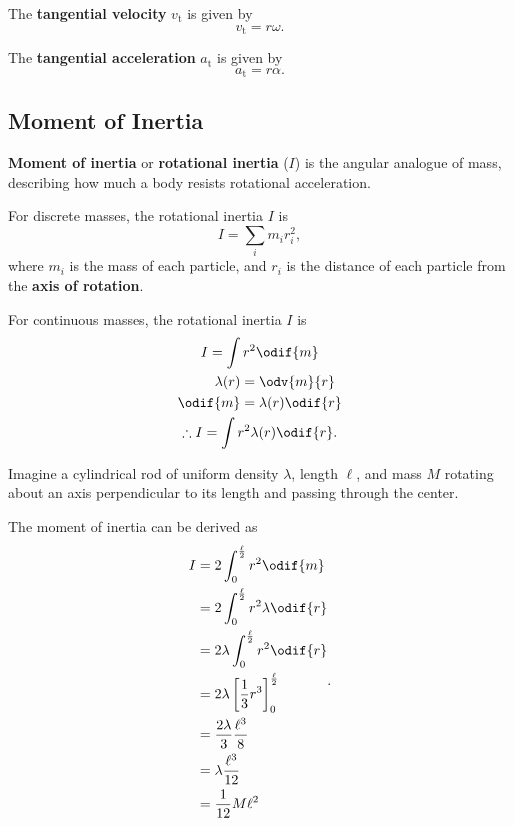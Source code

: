 The \textbf{tangential velocity} \(v_\mathrm{t}\) is given by
\begin{equation}
    v_\mathrm{t} = r \omega.
\end{equation}

The \textbf{tangential acceleration} \(a_\mathrm{t}\) is given by
\begin{equation}
    a_\mathrm{t} = r \alpha.
\end{equation}

\subsection{Moment of Inertia}

\textbf{Moment of inertia} or \textbf{rotational inertia} (\(I\)) is
the angular analogue of mass,
describing how much a body resists rotational acceleration.

For discrete masses, the rotational inertia \(I\) is
\begin{equation}
    I = \sum_i m_i r_i^2,
\end{equation}
where \(m_i\) is the mass of each particle,
and \(r_i\) is the distance of each particle from the \textbf{axis of rotation}.

For continuous masses, the rotational inertia \(I\) is
\begin{gather}
    I = \int r^2 \odif{m} \\
    \begin{aligned}
        \lambda(r) &= \odv{m}{r} \\
        \odif{m} &= \lambda(r) \odif{r}
    \end{aligned} \\
    \therefore I = \int r^2 \lambda(r) \odif{r}.
\end{gather}

Imagine a cylindrical rod of uniform density \(\lambda\), length
\(\ell\), and mass \(M\)
rotating about an axis perpendicular to its length and passing
through the center.

\begin{figure}[ht]
    \centering
    
\end{figure}

The moment of inertia can be derived as
\begin{equation} \label{eq:uniform-rod-rotational-inertia}
    \begin{aligned}
        I &= 2 \int_{0}^{\frac{\ell}{2}} r^2 \odif{m} \\
        &= 2 \int_{0}^{\frac{\ell}{2}} r^2 \lambda \odif{r} \\
        &= 2 \lambda \int_{0}^{\frac{\ell}{2}} r^2 \odif{r} \\
        &= 2 \lambda \left[\frac{1}{3} r^3 \right]^\frac{\ell}{2}_0 \\
        &= \frac{2 \lambda}{3} \frac{\ell^3}{8} \\
        &= \lambda \frac{\ell^3}{12} \\
        &= \frac{1}{12} M \ell^2
    \end{aligned}.
\end{equation}


